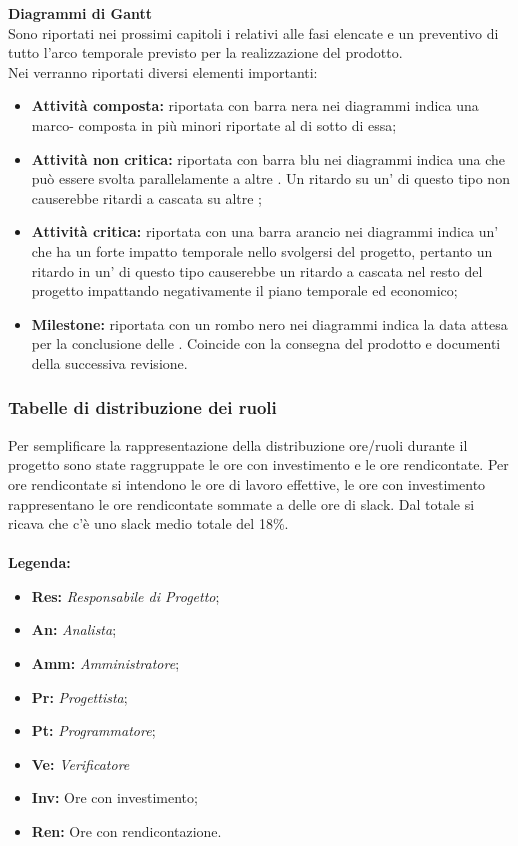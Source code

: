\documentclass{scalatekids-article}
\begin{document}
\textbf{Diagrammi di Gantt}\\
Sono riportati nei prossimi capitoli i  relativi alle fasi elencate e un  preventivo di tutto l'arco temporale previsto per la realizzazione del prodotto.\\
Nei  verranno riportati diversi elementi importanti:
\begin{itemize}
\item \textbf{Attività composta:} riportata con barra nera nei diagrammi indica una marco- composta in più  minori riportate al di sotto di essa;
\item \textbf{Attività non critica:} riportata con barra blu nei diagrammi indica una  che può essere svolta parallelamente a altre . Un ritardo su un' di questo tipo non causerebbe ritardi a cascata su altre ;
\item \textbf{Attività critica:} riportata con una barra arancio nei diagrammi indica un' che ha un forte impatto temporale nello svolgersi del progetto, pertanto un ritardo in un' di questo tipo causerebbe un ritardo a cascata nel resto del progetto impattando negativamente il piano temporale ed economico;
\item \textbf{Milestone:} riportata con un rombo nero nei diagrammi indica la data attesa per la conclusione delle . Coincide con la consegna del prodotto e documenti della successiva revisione.
\end{itemize}
\subsubsection{Tabelle di distribuzione dei ruoli}
Per semplificare la rappresentazione della distribuzione ore/ruoli durante il
progetto sono state raggruppate le ore con investimento e le ore rendicontate. Per ore rendicontate si intendono le ore di lavoro effettive, le ore con investimento rappresentano le ore rendicontate sommate a delle ore di slack. Dal totale si ricava che c'è uno slack medio totale del 18\%. \\ \\
\textbf{Legenda:}
\begin{itemize}
\item\textbf{Res:} \textit{Responsabile di Progetto};
\item\textbf{An:} \textit{Analista};
\item\textbf{Amm:} \textit{Amministratore};
\item\textbf{Pr:} \textit{Progettista};
\item\textbf{Pt:} \textit{Programmatore};
\item\textbf{Ve:} \textit{Verificatore}
\item\textbf{Inv:} Ore con investimento;
\item\textbf{Ren:} Ore con rendicontazione.
\end{itemize}
\end{document}
